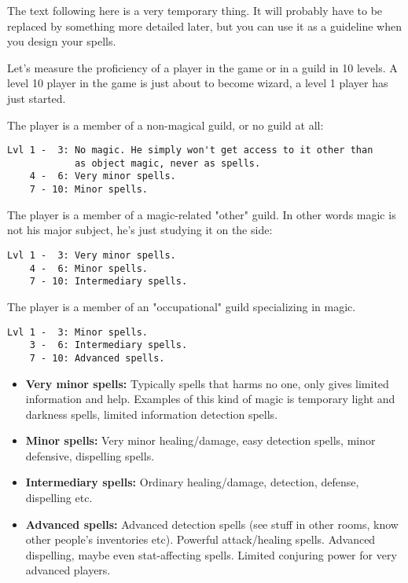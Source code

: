 The text following here is a very temporary thing. It will probably 
have to be replaced by something more detailed later, but you can use
it as a guideline when you design your spells. 

Let's measure the proficiency of a player in the game or in a guild
in 10 levels. A level 10 player in the game is just about to become
wizard, a level 1 player has just started.

The player is a member of a non-magical guild, or no guild at all:

\begin{verbatim}
Lvl 1 -  3: No magic. He simply won't get access to it other than
            as object magic, never as spells.
    4 -  6: Very minor spells.
    7 - 10: Minor spells.
\end{verbatim}

The player is a member of a magic-related "other" guild. In other words
magic is not his major subject, he's just studying it on the side:

\begin{verbatim}
Lvl 1 -  3: Very minor spells.
    4 -  6: Minor spells.
    7 - 10: Intermediary spells.
\end{verbatim}

The player is a member of an "occupational" guild specializing in magic.

\begin{verbatim}
Lvl 1 -  3: Minor spells.
    3 -  6: Intermediary spells.
    7 - 10: Advanced spells.
\end{verbatim}

\begin{itemize}
\item{\bf Very minor spells:} Typically spells that harms no one, only gives
            limited information and help. Examples of this
            kind of magic is temporary light and darkness
            spells, limited information detection spells.

\item{\bf Minor spells:} Very minor healing/damage, easy detection spells,
            minor defensive, dispelling spells.

\item{\bf Intermediary spells:} Ordinary healing/damage, detection, defense,
            dispelling etc.

\item{\bf Advanced spells:} Advanced detection spells (see stuff in other rooms,
            know other people's inventories etc). Powerful
            attack/healing spells. Advanced dispelling, maybe
            even stat-affecting spells. Limited conjuring power
            for very advanced players.
\end{itemize}


